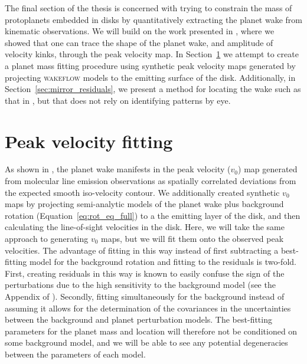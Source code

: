 The final section of the thesis is concerned with trying to constrain the mass of protoplanets embedded in disks by quantitatively extracting the planet wake from kinematic observations.
We will build on the work presented in \citet{calcino2022}, where we showed that one can trace the shape of the planet wake, and amplitude of velocity kinks, through the peak velocity map.
In Section~\ref{sec:v0_fitting} we attempt to create a planet mass fitting procedure using synthetic peak velocity maps generated by projecting \textsc{wakeflow} models to the emitting surface of the disk.
Additionally, in Section~\ref{sec:mirror_residuals}, we present a method for locating the wake such as that in \citet{calcino2022}, but that does not rely on identifying patterns by eye.

\section{Peak velocity fitting} \label{sec:v0_fitting}

As shown in \citet{calcino2022}, the planet wake manifests in the peak velocity ($v_0$) map generated from molecular line emission observations as spatially correlated deviations from the expected smooth iso-velocity contour.
We additionally created synthetic $v_0$ maps by projecting semi-analytic models of the planet wake plus background rotation (Equation~\ref{eq:rot_eq_full}) to a the emitting layer of the disk, and then calculating the line-of-sight velocities in the disk.
Here, we will take the same approach to generating $v_0$ maps, but we will fit them onto the observed peak velocities.
The advantage of fitting in this way instead of first subtracting a best-fitting model for the background rotation and fitting to the residuals is two-fold.
First, creating residuals in this way is known to easily confuse the sign of the perturbations due to the high sensitivity to the background model (see the Appendix of \citealt{calcino2022}).
Secondly, fitting simultaneously for the background instead of assuming it allows for the determination of the covariances in the uncertainties between the background and planet perturbation models.
The best-fitting parameters for the planet mass and location will therefore not be conditioned on some background model, and we will be able to see any potential degeneracies between the parameters of each model.

